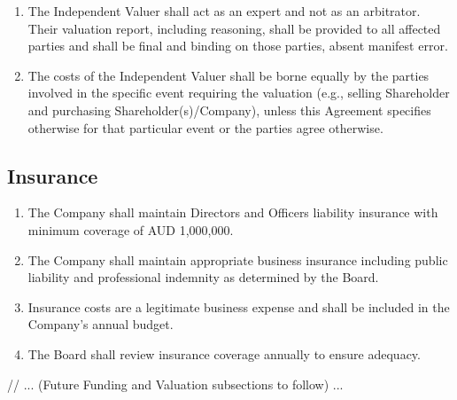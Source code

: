 \begin{enumerate}[label=(\alph*)]
\begin{enumerate}[label=(\roman*)]
    \item The Independent Valuer shall act as an expert and not as an arbitrator. Their valuation report, including reasoning, shall be provided to all affected parties and shall be final and binding on those parties, absent manifest error.
    \item The costs of the Independent Valuer shall be borne equally by the parties involved in the specific event requiring the valuation (e.g., selling Shareholder and purchasing Shareholder(s)/Company), unless this Agreement specifies otherwise for that particular event or the parties agree otherwise.
    \end{enumerate}
\end{enumerate}

\subsection{Insurance}
\begin{enumerate}[label=(\alph*)]
\item The Company shall maintain Directors and Officers liability insurance with minimum coverage of AUD 1,000,000.
\item The Company shall maintain appropriate business insurance including public liability and professional indemnity as determined by the Board.
\item Insurance costs are a legitimate business expense and shall be included in the Company's annual budget.
\item The Board shall review insurance coverage annually to ensure adequacy.
\end{enumerate}

// ... (Future Funding and Valuation subsections to follow) ... 